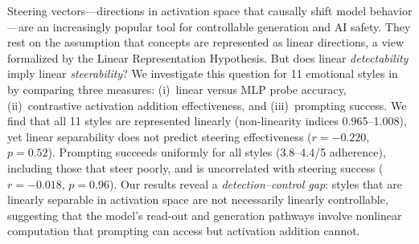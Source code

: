 Steering vectors---directions in activation space that causally shift model behavior---are an increasingly popular tool for controllable generation and AI safety. They rest on the assumption that concepts are represented as linear directions, a view formalized by the Linear Representation Hypothesis. But does linear \emph{detectability} imply linear \emph{steerability}? We investigate this question for 11 emotional styles in \pythia by comparing three measures: (i)~linear versus MLP probe accuracy, (ii)~contrastive activation addition effectiveness, and (iii)~prompting success. We find that all 11 styles are represented linearly (non-linearity indices 0.965--1.008), yet linear separability does not predict steering effectiveness ($r = -0.220$, $p = 0.52$). Prompting succeeds uniformly for all styles (3.8--4.4/5 adherence), including those that steer poorly, and is uncorrelated with steering success ($r = -0.018$, $p = 0.96$). Our results reveal a \emph{detection--control gap}: styles that are linearly separable in activation space are not necessarily linearly controllable, suggesting that the model's read-out and generation pathways involve nonlinear computation that prompting can access but activation addition cannot.
